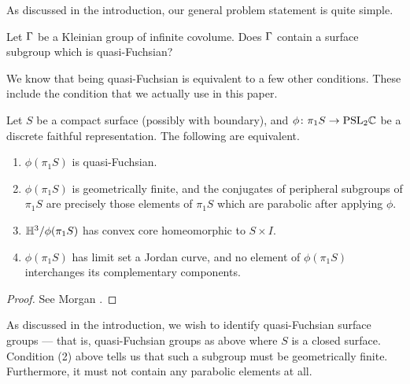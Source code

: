 As discussed in the introduction, our general problem statement is quite
simple.

\begin{prob}

Let $\Gamma$ be a Kleinian group of infinite covolume. Does $\Gamma$ contain
a surface subgroup which is quasi-Fuchsian?

\end{prob}

We know that being quasi-Fuchsian is equivalent to a few other conditions.
These include the condition that we actually use in this paper.

\begin{prop}

Let $S$ be a compact surface (possibly with boundary), and $\phi \colon \pi_1S
\to \mathrm{PSL}_2\mathbb{C}$ be a discrete faithful representation. The following are
equivalent.

\begin{enumerate}

\item $\phi(\pi_1S)$ is quasi-Fuchsian.

\item $\phi(\pi_1S)$ is geometrically finite, and the conjugates of peripheral
subgroups of $\pi_1S$ are precisely those elements of $\pi_1S$ which are
parabolic after applying $\phi$.

\item $\mathbb{H}^3/\phi(\pi_1S)$ has convex core homeomorphic to $S \times I$.

\item $\phi(\pi_1S)$ has limit set a Jordan curve, and no element of
$\phi(\pi_1S)$ interchanges its complementary components.

\end{enumerate}

\end{prop}

\begin{proof}

See Morgan \cite[Proposition 9.2]{Mo}.%

\end{proof}

As discussed in the introduction, we wish to identify quasi-Fuchsian surface
groups --- that is, quasi-Fuchsian groups as above where $S$ is a closed
surface.  Condition (2) above tells us that such a subgroup must be
geometrically finite.  Furthermore, it must not contain any parabolic elements
at all.

